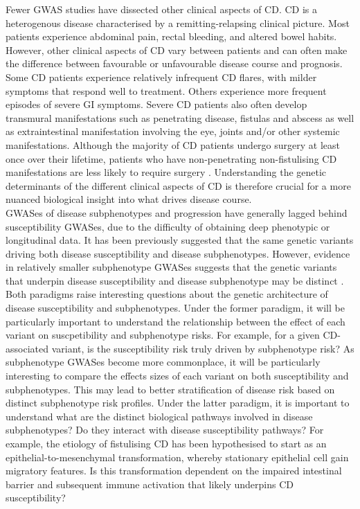 Fewer GWAS studies have dissected other clinical aspects of CD. CD is a heterogenous disease characterised by a remitting-relapsing clinical picture. Most patients experience abdominal pain, rectal bleeding, and altered bowel habits. However, other clinical aspects of CD vary between patients and can often make the difference between favourable or unfavourable disease course and prognosis. Some CD patients experience relatively infrequent CD flares, with milder symptoms that respond well to treatment. Others experience more frequent episodes of severe GI symptoms. Severe CD patients also often develop transmural manifestations such as penetrating disease, fistulas and abscess as well as extraintestinal manifestation involving the eye, joints and/or other systemic manifestations. Although the majority of CD patients undergo surgery at least once over their lifetime, patients who have non-penetrating non-fistulising CD manifestations are less likely to require surgery \cite{Lewis2010-gx}. Understanding the genetic determinants of the different clinical aspects of CD is therefore crucial for a more nuanced biological insight into what drives disease course.\\

GWASes of disease subphenotypes and progression have generally lagged behind susceptibility GWASes, due to the difficulty of obtaining deep phenotypic or longitudinal data. It has been previously suggested that the same genetic variants driving both disease susceptibility and disease subphenotypes. However, evidence in relatively smaller subphenotype GWASes suggests that the genetic variants that underpin disease susceptibility and disease subphenotype may be distinct \cite{Iwaki2019-mf,Severe_Covid-19_GWAS_Group2020-rn}. Both paradigms raise interesting questions about the genetic architecture of disease susceptibility and subphenotypes. Under the former paradigm, it will be particularly important to understand the relationship between the effect of each variant on suscpetibility and subphenotype risks. For example, for a given CD-associated variant, is the susceptibility risk truly driven by subphenotype risk? As subphenotype GWASes become more commonplace, it will be particularly interesting to compare the effects sizes of each variant on both susceptibility and subphenotypes. This may lead to better stratification of disease risk based on distinct subphenotype risk profiles. Under the latter paradigm, it is important to understand what are the distinct biological pathways involved in disease subphenotypes? Do they interact with disease susceptibility pathways? For example, the etiology of fistulising CD has been hypothesised to start as an epithelial-to-mesenchymal transformation, whereby stationary epithelial cell gain migratory features. Is this transformation dependent on the impaired intestinal barrier and subsequent immune activation that likely underpins CD susceptibility?

